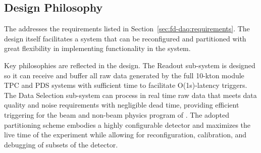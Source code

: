 \begin{dunetable}
\end{dunetable}

\subsection{Design Philosophy}

The    addresses the requirements listed in
Section~\ref{sec:fd-daq:requirements}. The design itself facilitates a  system
that can be reconfigured and partitioned with great flexibility in implementing
 functionality in the system. 

Key philosophies are reflected in the design. The Readout sub-system is
designed so it can receive and buffer all raw data generated by
the full 10-kton module TPC and PDS systems with sufficient time to
facilitate O(1s)-latency triggers. The Data Selection sub-system
can process in real time raw data that meets data quality and noise
requirements with negligible dead time, providing
efficient triggering for the beam and non-beam physics program of
. The adopted  partitioning scheme embodies a
highly configurable detector and maximizes the live time of the experiment while allowing for
reconfiguration, calibration, and debugging of subsets of the detector. 

